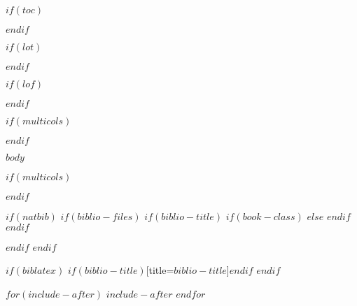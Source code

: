 \documentclass[$fontsize$pt,$if(lang)$$lang$,$endif$$if(papersize)$$papersize$,$endif$$for(classoption)$$classoption$$sep$,$endfor$,openany]{$documentclass$}
\begin{document}
$if(toc)$
{
  \setcounter{tocdepth}{$toc-depth$}


  \hypersetup{linkcolor=black}
  \setcounter{secnumdepth}{-1}

  \tableofcontents

  \newpage
}
$endif$

$if(lot)$
\listoftables
$endif$

$if(lof)$
\listoffigures
$endif$

$if(multicols)$
\begin{multicols}{2}
$endif$

$body$

$if(multicols)$
\end{multicols}
$endif$

$if(natbib)$
  $if(biblio-files)$
    $if(biblio-title)$
      $if(book-class)$
        \renewcommand\bibname{$biblio-title$}
      $else$
        \renewcommand\refname{$biblio-title$}
      $endif$
    $endif$
    
  $endif$
$endif$

$if(biblatex)$
  \printbibliography$if(biblio-title)$[title=$biblio-title$]$endif$
$endif$

$for(include-after)$
  $include-after$
$endfor$
\end{document}
